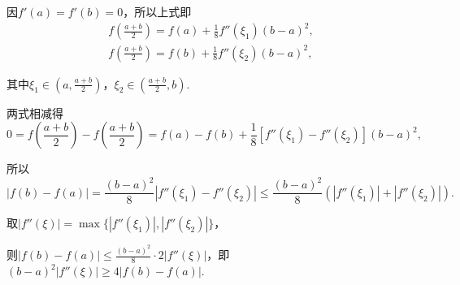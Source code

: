 \documentclass[../Main.tex]{subfiles}
\begin{document}
\begin{enumerate}
          因$f'(a)=f'(b)=0$，所以上式即
          \[
              \begin{gathered}
                  f\left(\frac{a+b}{2}\right)=f(a)+\frac{1}{8}f''(\xi_1)(b-a)^{2},\\
                  f\left(\frac{a+b}{2}\right)=f(b)+\frac{1}{8}f''(\xi_2)(b-a)^{2},
              \end{gathered}
          \]

          其中$\xi_{1}\in\left(a,\frac{a+b}{2}\right)$，$\xi_{2}\in\left(\frac{a+b}{2}
              ,b\right)$.

          两式相减得
          \[
              0=f\left(\frac{a+b}{2}\right)-f\left(\frac{a+b}{2}\right)=f(a)-f(b)+\frac{1}{8}
              \left[f''(\xi_{1})-f''(\xi_{2})\right](b-a)^{2},
          \]

          所以
          \[
              |f(b)-f(a)|=\frac{(b-a)^{2}}{8}\left|f''(\xi_{1})-f''(\xi_{2})\right|\leq
              \frac{(b-a)^{2}}{8}\left(|f''(\xi_{1})|+|f''(\xi_{2})|\right).
          \]

          取$|f''(\xi)|=\max\{|f''(\xi_{1})|,|f''(\xi_{2})|\}$，

          则$|f(b)-f(a)|\leq \frac{(b-a)^{2}}{8}\cdot 2|f''(\xi)|$，即$(b-a)^{2}|f''(
              \xi)|\geq 4|f(b)-f(a)|$.
\end{enumerate}
\end{document}
